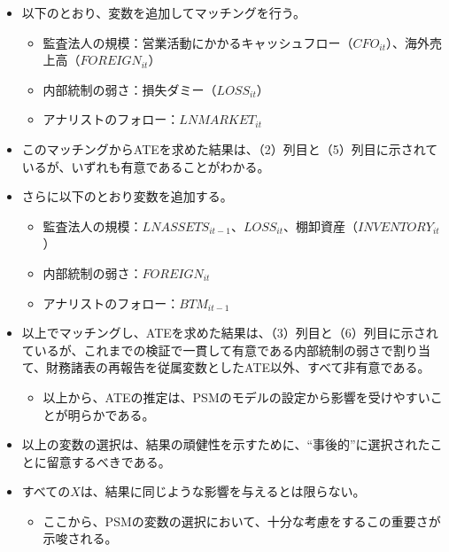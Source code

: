\begin{itemize}
 \item 以下のとおり、変数を追加してマッチングを行う。
  \begin{itemize}
   \item 監査法人の規模：営業活動にかかるキャッシュフロー（$\mathit{CFO}_{it}$）、海外売上高（$\mathit{FOREIGN}_{it}$）
   \item 内部統制の弱さ：損失ダミー（$\mathit{LOSS}_{it}$）
   \item アナリストのフォロー：$\mathit{LNMARKET}_{it}$
  \end{itemize}
 \item このマッチングからATEを求めた結果は、（2）列目と（5）列目に示されているが、いずれも有意であることがわかる。
 \item さらに以下のとおり変数を追加する。
  \begin{itemize}
   \item 監査法人の規模：$\mathit{LNASSETS}_{it-1}$、$LOSS_{it}$、棚卸資産（$\mathit{INVENTORY}_{it}$）
   \item 内部統制の弱さ：$\mathit{FOREIGN}_{it}$
   \item アナリストのフォロー：$\mathit{BTM}_{it-1}$
  \end{itemize}
 \item 以上でマッチングし、ATEを求めた結果は、（3）列目と（6）列目に示されているが、これまでの検証で一貫して有意である内部統制の弱さで割り当て、財務諸表の再報告を従属変数としたATE以外、すべて非有意である。
  \begin{itemize}
   \item 以上から、ATEの推定は、PSMのモデルの設定から影響を受けやすいことが明らかである。
  \end{itemize}
 \item 以上の変数の選択は、結果の頑健性を示すために、``事後的''に選択されたことに留意するべきである。
 \item すべての$X$は、結果に同じような影響を与えるとは限らない。
  \begin{itemize}
   \item ここから、PSMの変数の選択において、十分な考慮をするこの重要さが示唆される。
  \end{itemize}
\end{itemize}
